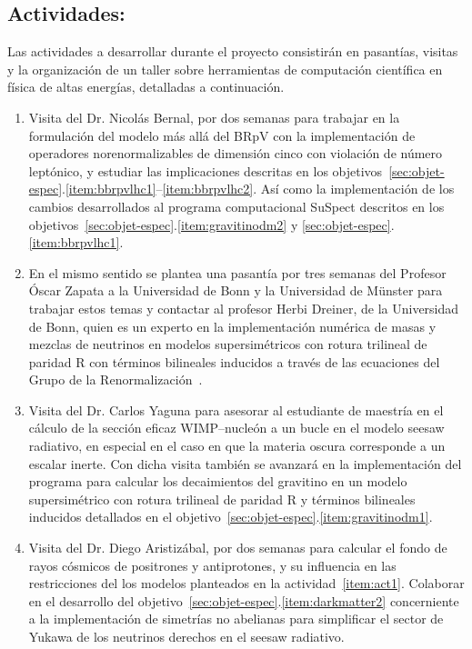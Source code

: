 \subsection{Actividades:                                   }
\label{sec:actividades}
Las actividades a desarrollar durante el proyecto consistirán en
pasantías, visitas y la organización de un taller sobre herramientas
de computación científica en física de altas energías, detalladas a
continuación.

\begin{enumerate}
\item Visita del Dr. Nicolás Bernal, por dos semanas para trabajar en
  la formulación del modelo más allá del BRpV con la implementación de
  operadores norenormalizables de dimensión cinco con violación de
  número leptónico, y estudiar las implicaciones descritas en los
  objetivos~\ref{sec:objet-espec}.\ref{item:bbrpvlhc1}--\ref{item:bbrpvlhc2}. Así
  como la implementación de los cambios desarrollados al programa
  computacional SuSpect descritos en los
  objetivos~\ref{sec:objet-espec}.\ref{item:gravitinodm2} y
  \ref{sec:objet-espec}.\ref{item:bbrpvlhc1}.
  
  \label{item:act1}

\item En el mismo sentido se plantea una pasantía por tres semanas del
  Profesor Óscar Zapata a la Universidad de Bonn y la Universidad de
  Münster para trabajar estos temas y contactar al profesor Herbi
  Dreiner, de la Universidad de Bonn, quien es un experto en la
  implementación numérica de masas y mezclas de neutrinos en modelos
  supersimétricos con rotura trilineal de paridad R con términos
  bilineales inducidos a través de las ecuaciones del Grupo de la
  Renormalización~\cite{Dreiner:2011ft}.
  \label{item:act2}
\item Visita del Dr. Carlos Yaguna para asesorar al estudiante de
  maestría en el cálculo de la sección eficaz WIMP--nucleón a un bucle
  en el modelo seesaw radiativo, en especial en el caso en que la
  materia oscura corresponde a un escalar inerte. Con dicha visita
  también se avanzará en la implementación del programa para calcular
  los decaimientos del gravitino en un modelo supersimétrico con
  rotura trilineal de paridad R y términos bilineales inducidos
  detallados en el
  objetivo~\ref{sec:objet-espec}.\ref{item:gravitinodm1}.
  \label{item:act3}

\item Visita del Dr. Diego Aristizábal, por dos semanas para  calcular el
  fondo de rayos cósmicos de positrones y antiprotones, y  su
  influencia en las restricciones del los modelos planteados en la
  actividad~\ref{item:act1}. Colaborar en el desarrollo del
  objetivo~\ref{sec:objet-espec}.\ref{item:darkmatter2} concerniente
  a la implementación de simetrías no abelianas para simplificar el
  sector de Yukawa de los neutrinos derechos en el seesaw radiativo.
  \label{item:act4}


\end{enumerate}
